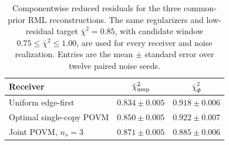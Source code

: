 \begin{table}[t]
\caption{Componentwise reduced residuals for the three common-prior RML reconstructions. The same regularizers and low-residual target $\bar{\chi}^{2}=0.85$, with candidate window $0.75\leq\bar{\chi}^{2}\leq1.00$, are used for every receiver and noise realization. Entries are the mean $\pm$ standard error over twelve paired noise seeds.}
\label{tab:rml_chi2}
\centering
\small
\begin{ruledtabular}
\begin{tabular}{lcc}
Receiver & $\bar{\chi}^{2}_{\rm amp}$ & $\bar{\chi}^{2}_{\Phi}$ \\
\hline
Uniform edge-first & $0.834 \pm 0.005$ & $0.918 \pm 0.006$ \\
Optimal single-copy POVM & $0.850 \pm 0.005$ & $0.922 \pm 0.007$ \\
Joint POVM, $n_s=3$ & $0.871 \pm 0.005$ & $0.885 \pm 0.006$ \\
\end{tabular}
\end{ruledtabular}
\end{table}
